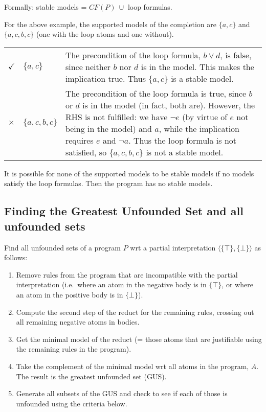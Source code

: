 \documentclass[9pt,a4paper,landscape]{article}
\begin{document}
{\vspace{\baselineskip}

Formally: stable models = $CF(P)\ \cup$ loop formulas.

\vspace{\baselineskip}

For the above example, the supported models of the completion are $\{a, c\}$ and $\{a, c, b, c\}$ (one with the loop atoms and one without).

\begin{center}
	\begin{tabular}{llp{20cm}}
		$\checkmark$ & $\{a, c\}$ & The precondition of the loop formula, $b \lor d$, is false, since neither $b$ nor $d$ is in the model. This makes the implication true. Thus $\{a, c\}$ is a stable model. \\
		$\times$ & $\{a, c, b, c\}$ & The precondition of the loop formula is true, since $b$ or $d$ is in the model (in fact, both are). However, the RHS is not fulfilled: we have $\neg e$ (by virtue of $e$ not being in the model) and $a$, while the implication requires $e$ and $\neg a$. Thus the loop formula is not satisfied, so $\{a, c, b, c\}$ is not a stable model.\\
	\end{tabular}
\end{center}

It is possible for none of the supported models to be stable models if no models satisfy the loop formulas. Then the program has no stable models.

\pagebreak


\subsection{Finding the Greatest Unfounded Set and all unfounded sets}
\label{subsec:unf}

Find all unfounded sets of a program $P$ wrt a partial interpretation $\langle \{\top\}, \{\bot\} \rangle$ as follows:
\begin{enumerate}[noitemsep]
	\item Remove rules from the program that are incompatible with the partial interpretation (i.e.\ where an atom in the negative body is in $\{\top\}$, or where an atom in the positive body is in $\{\bot\}$).
	\item Compute the second step of the reduct for the remaining rules, crossing out all remaining negative atoms in bodies.
	\item Get the minimal model of the reduct (= those atoms that are justifiable using the remaining rules in the program).
	\item Take the complement of the minimal model wrt all atoms in the program, $A$. The result is the greatest unfounded set (GUS).
	\item Generate all subsets of the GUS and check to see if each of those is unfounded using the criteria below.
\end{enumerate}

}
\end{document}
